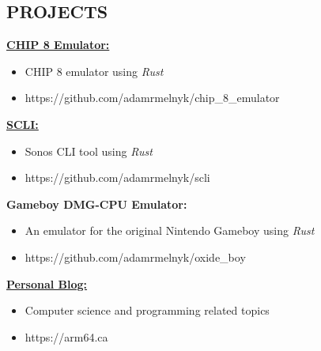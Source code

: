 \documentclass[margin, 10pt]{res} %
\begin{document}
\begin{resume}
\section{PROJECTS}
\href{https://github.com/adamrmelnyk/chip_8_emulator}{\bf CHIP 8 Emulator:} 
\begin{itemize}
    \item CHIP 8 emulator using {\it Rust}
    \item https://github.com/adamrmelnyk/chip\_8\_emulator
\end{itemize}
\href{https://github.com/adamrmelnyk/scli}{\bf SCLI:}
\begin{itemize}
    \item Sonos CLI tool using {\it Rust}
    \item https://github.com/adamrmelnyk/scli
\end{itemize}
{\bf Gameboy DMG-CPU Emulator:}
\begin{itemize}
    \item An emulator for the original Nintendo Gameboy using {\it Rust}
    \item https://github.com/adamrmelnyk/oxide\_boy
\end{itemize}
\href{https://arm64.ca}{\bf Personal Blog:}
\begin{itemize}
    \item Computer science and programming related topics
    \item https://arm64.ca
\end{itemize}

\end{resume}
\end{document}
